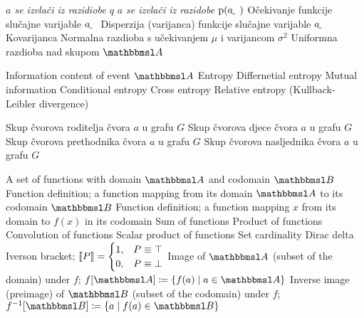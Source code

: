  {\textit{$a$ se izvlači iz razidiobe $q$}}
 {\textit{$a$ se izvlači iz razidobe $\p(\rvar a)$}}
 {Očekivanje funkcije slučajne varijable $\rvar a$}
 {Disperzija (varijanca) funkcije slučajne varijable $\rvar a$}
		{Kovarijanca}
 {Normalna razdioba s učekivanjem $\mu$ i varijancom $\sigma^2$}
	{Uniformna razdioba nad skupom $\set A$}

	{Information content of event $\set A$}
	{Entropy}
	{Differnetial entropy}
	{Mutual information}
	{Conditional entropy}
	{Cross entropy}
	{Relative entropy (Kullback-Leibler divergence)}

	{Skup čvorova roditelja čvora $a$ u grafu $G$}
	{Skup čvorova djece čvora $a$ u grafu $G$}
	{Skup čvorova prethodnika čvora $a$ u grafu $G$}
	{Skup čvorova nasljednika čvora $a$ u grafu $G$}

	{A set of functions with domain $\set A$ and codomain $\set B$}
	{Function definition; a function mapping from its domain $\set A$ to its codomain $\set B$}
	{Function definition; a function mapping $x$ from its domain to $f(x)$ in its codomain}
	{Sum of functions}
	{Product of functions}
	{Convolution of functions}
	{Scalar product of functions}
	{Set cardinality}
	{Dirac delta}
	{Iverson bracket; $\enbbracket{P}=\begin{cases} 1, & P \equiv \top \\ 0, & P \equiv \bot \end{cases}$}
	{Image of $\set A$ (subset of the domain) under $f$; $f\sbr{\set A} \coloneqq \cbr{f(a)\mid a\in\set A}$}
	{Inverse image (preimage) of $\set B$ (subset of the codomain) under $f$; $f^{-1}\sbr{\set B} \coloneqq \cbr{a\mid f(a)\in\set B}$}